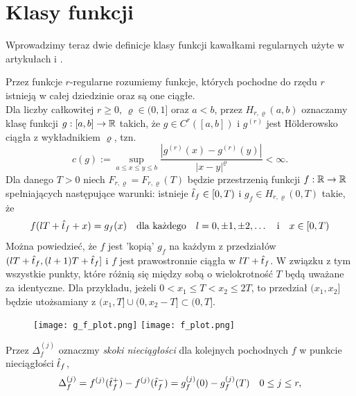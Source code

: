 \documentclass[oik, pdftex, man]{mgrwms}
\begin{document}
\section{Klasy funkcji} \label{rozdzial:klasy_funkcji}

    Wprowadzimy teraz dwie definicje klasy funkcji kawałkami regularnych użyte w artykułach \cite{CoDF} i \cite{AoP}. 

    Przez funkcje $r$-regularne rozumiemy funkcje, których pochodne do rzędu $r$ istnieją w całej dziedzinie oraz są one ciągłe. \\
    Dla liczby całkowitej $ r \geq 0$, $\varrho \in (0,1]$ oraz $a < b$, przez $H_{r, \varrho}(a,b)$ oznaczamy klasę funkcji $g: [a,b] \rightarrow \mathbb{R}$ takich, że $g \in C^r([a, b])$ i $g^{(r)}$ jest Hölderowsko ciągła z wykładnikiem $\varrho$, tzn.
    \begin{equation*}
        c(g) := \sup_{a \leq x \leq y \leq b} \frac{|g^{(r)}(x) - g^{(r)}(y)|}{|x-y|^{\varrho}} < \infty.
    \end{equation*}
    Dla danego $T > 0$ niech $F_{r, \varrho} = F_{r, \varrho}(T)$ będzie przestrzenią funkcji $f: \mathbb{R} \rightarrow \mathbb{R}$ spełniających następujące warunki: istnieje $\hat{t}_{f} \in [0, T)$ i $g_f \in H_{r, \varrho}(0,T)$ takie, że
    \begin{equation*}
        f(lT + \hat{t}_f + x) = g_f(x) \quad \text{dla każdego} \quad l = 0, \pm 1, \pm 2, \ldots \quad \text{i} \quad x \in [0, T)
    \end{equation*}
    Można powiedzieć, że $f$ jest 'kopią' $g_f$ na każdym z przedziałów $(lT + \hat{t}_f, (l + 1)T + \hat{t}_f]$ i $f$ jest prawostronnie ciągła w $lT + \hat{t}_f$. W związku z tym wszystkie punkty, które różnią się między sobą o wielokrotność $T$ będą uważane za identyczne. Dla przykładu, jeżeli $0 < x_1 \leq T < x_2 \leq 2T$, to przedział $(x_1, x_2]$ będzie utożsamiany z $(x_1,T] \cup (0, x_2 - T] \subset (0, T]$.

    \begin{figure}[h!]
        \texttt{[image: g\_f\_plot.png]}
        \texttt{[image: f\_plot.png]}
    \end{figure}


    Przez $\Delta_f^{(j)}$ oznaczmy \emph{skoki nieciągłości} dla kolejnych pochodnych $f$ w punkcie nieciągłości $\hat{t}_f$,
    \begin{equation*}
        \Delta_f^{(j)} = f^{(j)}(\hat{t}_f^+) - f^{(j)}(\hat{t}_f^-) = g_f^{(j)}(0) - g_f^{(j)}(T) \quad 0 \leq j \leq r,
    \end{equation*}
\end{document}
